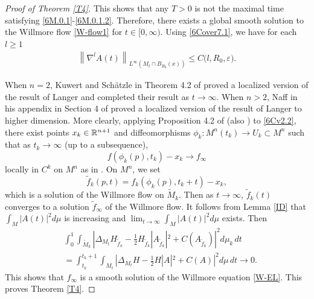 \documentclass{amsart}
\theoremstyle{definition}
\def\R{{\Bbb R}}
\numberwithin{equation}{section}
\begin{document}
\begin{proof}[Proof of Theorem   \ref{T4}]
 This shows that any $T>0$ is not the maximal time satisfying \eqref{6M.0.1}-\eqref{6M.0.1.2}.
Therefore,   there exists  a global  smooth solution to the Willmore flow \eqref{W-flow1} for    $t\in [0,\infty )$. Using \eqref{6Cover7.1}, we have for each $l\geq 1$
 \begin{align}\label{6Cv2.2}
  \left\| \nabla^{l} A(t) \right\|_{L^{\infty}(M_t\cap B_{R_0}(x))} \leq C\big ( l, R_0, \varepsilon \big ) \mbox{.} \end{align}

When $n=2$,     Kuwert and  Sch\"{a}tzle in Theorem 4.2 of \cite{KS2}  proved a  localized version of the result of  Langer \cite{Lan} and completed their result as $t\to \infty$.
When $n>2$, Naff  in his appendix in  Section 4 of \cite{Na}   proved a  localized version of the result of  Langer to higher dimension.
More clearly,
applying Proposition 4.2 of  \cite{Na} (also \cite{Ha1}) to \eqref{6Cv2.2},
there exist points $x_k\in \R^{n+1}$ and diffeomorphisms $\phi_k : M^n(t_k)  \to U_k\subset M^n$ such that  as $t_k\to\infty$ (up to a subsequence),
\[f(\phi_k(p), t_k) - x_k \to f_{\infty}\]
locally in $C^k$ on $M^n$ as in \cite{KS2}. On $M^n$, we set
\[\tilde f_k(p, t)=f_k(\phi_k(p), t_k+t )-x_k,\]
which is a solution of the  Willmore flow on $\tilde M_k$.
Then as $t\to\infty$, $\tilde f_k(t)$ converges to a solution  $\tilde f_{\infty}$ of the  Willmore flow.
It follows from  Lemma \ref{ID}  that $\int_M |A (t)|^2 d\mu$ is increasing and $\lim_{t\to \infty}\int_M |A (t)|^2 d\mu$ exists.  Then
\begin{align*}
&\int_{0}^{1}\int_{\tilde M_k} |\Delta_{M_t} H_{\tilde f_k} -\frac 12H_{\tilde f_k}|A_{\tilde f_k}|^2+ C(A_{\tilde f_k})|^2   d\mu_k\,dt\\
&=
\int_{t_k}^{t_k+1}\int_{M_t} |\Delta_{M_t} H-\frac 12H|A|^2+ C(A)|^2 d\mu\,dt \to 0.\end{align*}
This shows that $f_{\infty}$ is a smooth solution of  the Willmore equation \eqref{W-EL}.
This proves Theorem  \ref{T4}.
 \end{proof}
\end{document}
